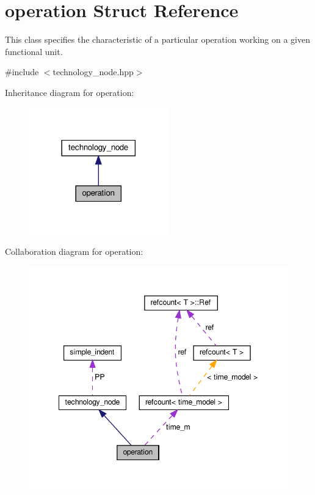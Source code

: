 \hypertarget{structoperation}{}\section{operation Struct Reference}
\label{structoperation}


This class specifies the characteristic of a particular operation working on a given functional unit.  




{\ttfamily \#include $<$technology\+\_\+node.\+hpp$>$}



Inheritance diagram for operation\+:
\nopagebreak
\begin{figure}[H]
\begin{center}
\leavevmode
\includegraphics[width=170pt]{d2/d47/structoperation__inherit__graph}
\end{center}
\end{figure}


Collaboration diagram for operation\+:
\nopagebreak
\begin{figure}[H]
\begin{center}
\leavevmode
\includegraphics[width=348pt]{d8/d24/structoperation__coll__graph}
\end{center}
\end{figure}
